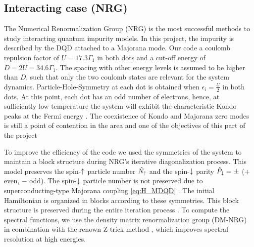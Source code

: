 \documentclass[showpacs,aps,prb,reprint,superscriptaddress]{revtex4-1}
\begin{document}

    


%

\subsection{Interacting case (NRG)}


The Numerical Renormalization Group (NRG) \cite{wilson_renormalization_1975,sindel_numerical_2005,bulla_numerical_2008} is the most successful methods to study interacting quantum impurity models. In this project, the impurity is described by the DQD attached to a Majorana mode. Our code a coulomb repulsion factor of $U =17.3\Gamma_1$ in both dots and a cut-off energy of $D=2U=34.6\Gamma_1$. The spacing with other energy levels is assumed to be higher than $D$, such that only the two coulomb states are relevant for the system dynamics. Particle-Hole-Symmetry at each dot is obtained when  $\epsilon_i = \frac{U}{2}$ in both dots. At this point, each dot has an odd number of electrons, hence, at sufficiently low temperature the system will exhibit the characteristic Kondo peaks at the Fermi energy \citet{wilson_renormalization_1975}. The coexistence of Kondo and Majorana zero modes is still a point of contention in the area and one of the objectives of this part of the project




To  improve the efficiency of the code we used the symmetries of the system to maintain a block structure during NRG's iterative diagonalization process. This model preserves the spin-$\uparrow$ particle number $\hat{N}_\uparrow$ and the spin-$\downarrow$ parity $\hat{P}_\downarrow = \pm $ ($+$ even, $-$ odd). The spin-$\downarrow$ particle number is not preserved due to superconducting-type Majorana coupling  \eqref{eq:H_MDQD} . The initial Hamiltonian is organized in blocks according to these symmetries. This block structure is preserved during the entire iteration process \cite{bulla_numerical_2008}. To compute the spectral functions, we use the density matrix renormalization group (DM-NRG)  \cite{hofstetter_generalized_2000} in combination with the renown Z-trick method \cite{oliveira_generalized_1994}, which improves spectral resolution at high energies.
  
\end{document}
